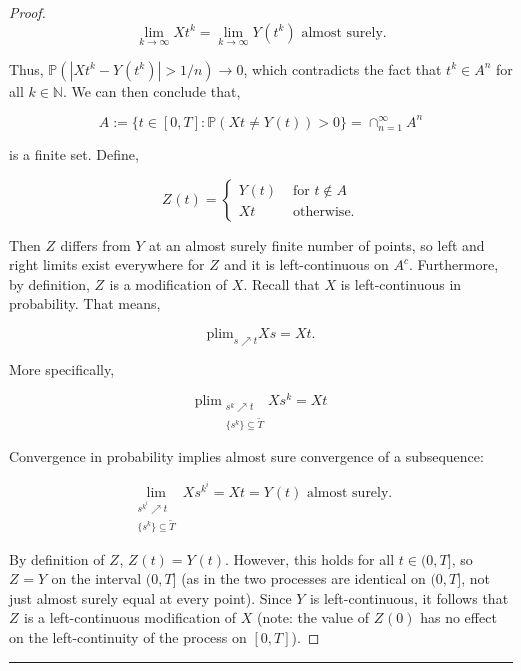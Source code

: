 \documentclass[12pt]{article}
\newcommand{\mb}{\mathbb}
\newcommand{\ra}{\rightarrow}
\newcommand{\te}{\text}
\newcommand{\lin}{\rule{\linewidth}{0.4 pt}}
\newcommand{\pr}{\mb{P}}							%
\newcommand{\T}{T}								%
\renewcommand{\t}{t}							%
\renewcommand{\tt}{s}							%
\newcommand{\X}{X}								%
\newcommand{\pup}[1]{^{#1}}							%
\renewcommand{\it}{k}								%
\newcommand{\itt}{i}								%
\newcommand{\numb}{n}								%
\newcommand{\rxvtt}[2]{Y_{#1}{(#2)}}				%
\newcommand{\rxvttt}[2]{Z_{#1}{(#2)}}				%
\newcommand{\rxvtts}[2]{Y_{#1}{#2}}					%
\newcommand{\rxvttts}[2]{Z_{#1}{#2}}				%
\newcommand{\alt}{\widetilde}						%
\newcommand{\typset}{A}							%
\begin{document}
\begin{proof}
\[\lim_{\it \ra\infty} \X{}{\t\pup{\it}} = \lim_{\it\ra\infty} \rxvtt{}{\t\pup{\it}} \te{ almost surely.}\]

Thus, \(\pr(|\X{}{\t\pup{\it}} - \rxvtt{}{\t\pup{\it}}| > 1/\numb) \ra 0\), which contradicts the fact that \(\t\pup{\it} \in \typset\pup{\numb}\) for all \(\it\in\mb{N}\). We can then conclude that,

\[\typset:= \{\t\in [0,\T]: \pr(\X{}{\t} \neq \rxvtt{}{\t}) > 0\} = \cap_{\numb = 1}^\infty \typset\pup{\numb}\]

is a finite set. Define,

\[\rxvttt{}{\t}= \begin{cases}
\rxvtt{}{\t} &\te{ for } \t \notin \typset\\
\X{}{\t} &\te{ otherwise.}
\end{cases}\]

Then \(\rxvttts{}{}\) differs from \(\rxvtts{}{}\) at an almost surely finite number of points, so left and right limits exist everywhere for \(\rxvttts{}{}\) and it is left-continuous on \(\typset^c\). Furthermore, by definition, \(\rxvttts{}{}\) is a modification of \(\X{}{}\). Recall that \(\X{}{}\) is left-continuous in probability. That means,

\[\te{plim}_{\tt\nearrow \t} \X{}{\tt} = \X{}{\t}.\]

More specifically,

\[\te{plim}_{\substack{\tt\pup{\it}\nearrow \t\\\{\tt\pup{\it}\} \subseteq \alt{T}}} \X{}{\tt\pup{\it}} = \X{}{\t}\]

Convergence in probability implies almost sure convergence of a subsequence:

\[\lim_{\substack{\tt\pup{\it\pup{\itt}} \nearrow \t\\\{\tt\pup{\it}\}\subseteq \alt{T}}} \X{}{\tt\pup{\it\pup{\itt}}} = \X{}{\t} = \rxvtt{}{\t} \te{ almost surely.}\]

By definition of \(\rxvttts{}{}\), \(\rxvttt{}{\t} = \rxvtt{}{\t}\). However, this holds for all \(\t \in (0,\T]\), so \(\rxvttts{}{} = \rxvtts{}{}\) on the interval \((0,\T]\) (as in the two processes are identical on \((0,\T]\), not just almost surely equal at every point). Since \(\rxvtts{}{}\) is left-continuous, it follows that \(\rxvttts{}{}\) is a left-continuous modification of \(\X{}{}\) (note: the value of \(\rxvttt{}{0}\) has no effect on the left-continuity of the process on \([0,\T]\)).
\end{proof}

\lin
\end{document}

